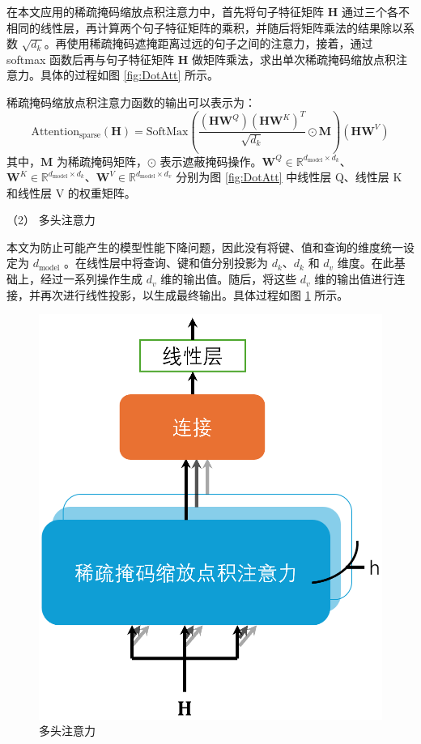 在本文应用的稀疏掩码缩放点积注意力中，首先将句子特征矩阵 \( \textbf{H} \) 通过三个各不相同的线性层，再计算两个句子特征矩阵的乘积，并随后将矩阵乘法的结果除以系数 \(\sqrt{d_k}\)。再使用稀疏掩码遮掩距离过远的句子之间的注意力，接着，通过 softmax 函数后再与句子特征矩阵 \( \textbf{H} \) 做矩阵乘法，求出单次稀疏掩码缩放点积注意力。具体的过程如图 \ref{fig:DotAtt} 所示。

稀疏掩码缩放点积注意力函数的输出可以表示为：
\begin{equation}
\text{Attention}_\text{sparse}(\textbf{H}) = \text{SoftMax} \left( \frac{(\textbf{HW}^Q)(\textbf{HW}^K)^T}{\sqrt{d_k}} \odot \textbf{M} \right) (\textbf{HW}^V)
\label{eq3.1}
\end{equation}
其中，\(\textbf{M}\) 为稀疏掩码矩阵，\(\odot\) 表示遮蔽掩码操作。\(\textbf{W}^Q \in \mathbb{R}^{d_{\text{model}} \times d_k}\)、\(\textbf{W}^K \in \mathbb{R}^{d_{\text{model}} \times d_k}\)、\(\textbf{W}^V \in \mathbb{R}^{d_{\text{model}} \times d_v}\) 分别为图 \ref{fig:DotAtt} 中线性层 Q、线性层 K 和线性层 V 的权重矩阵。

（2） 多头注意力

本文为防止可能产生的模型性能下降问题，因此没有将键、值和查询的维度统一设定为 \(d_{\text{model}}\) 。在线性层中将查询、键和值分别投影为 \(d_k\)、\(d_k\) 和 \(d_v\) 维度。在此基础上，经过一系列操作生成 \(d_v\) 维的输出值。随后，将这些 \(d_v\) 维的输出值进行连接，并再次进行线性投影，以生成最终输出。具体过程如图 \ref{fig:MultiheadAtt} 所示。

\begin{figure}[htbp]
	\centering
	\includegraphics[scale = 0.4]{figures/MultiheadAtt}
	\caption{多头注意力 \cite{transformer}}
	\label{fig:MultiheadAtt}
\end{figure}

